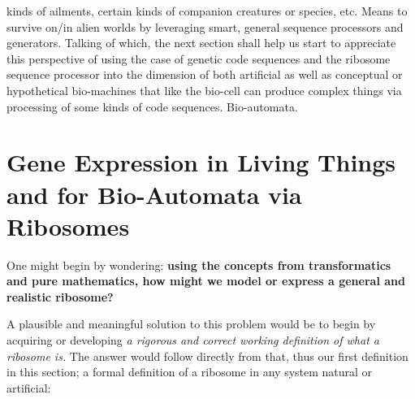 \documentclass[a4paper, 18pt]{book} %
\begin{document}
kinds of ailments, certain kinds of companion creatures or species, etc. Means to survive on/in alien worlds by leveraging smart, general sequence processors and generators. Talking of which, the next section shall help us start to appreciate this perspective of using the case of genetic code sequences and the ribosome sequence processor into the dimension of both artificial as well as conceptual or hypothetical bio-machines that like the bio-cell can produce complex things via processing of some kinds of code sequences. Bio-automata.

\section{Gene Expression in Living Things and for Bio-Automata via Ribosomes}
\label{SEC5}

One might begin by wondering: \textbf{using the concepts from transformatics and pure mathematics, how might we model or express a general and realistic ribosome?} 

A plausible and meaningful solution to this problem would be to begin by acquiring or developing \textit{a rigorous and correct working definition of what a ribosome is.} The answer would follow directly from that, thus our first definition in this section; a formal definition of a ribosome in any system natural or artificial:


\end{document}
